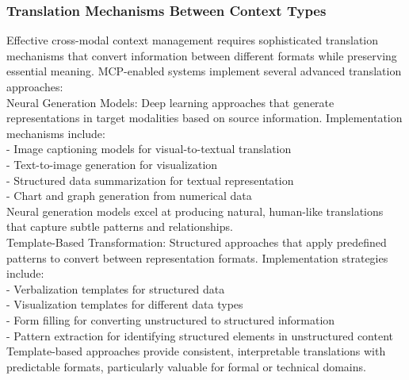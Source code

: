 \subsubsection{Translation Mechanisms Between Context Types}
Effective cross-modal context management requires sophisticated translation mechanisms that convert information between different formats while preserving essential meaning. MCP-enabled systems implement several advanced translation approaches:\\ \newline
Neural Generation Models: Deep learning approaches that generate representations in target modalities based on source information. Implementation mechanisms include:\\ \newline
- Image captioning models for visual-to-textual translation\\ \newline
- Text-to-image generation for visualization\\ \newline
- Structured data summarization for textual representation\\ \newline
- Chart and graph generation from numerical data\\ \newline
Neural generation models excel at producing natural, human-like translations that capture subtle patterns and relationships.\\ \newline
Template-Based Transformation: Structured approaches that apply predefined patterns to convert between representation formats. Implementation strategies include:\\ \newline
- Verbalization templates for structured data\\ \newline
- Visualization templates for different data types\\ \newline
- Form filling for converting unstructured to structured information\\ \newline
- Pattern extraction for identifying structured elements in unstructured content\\ \newline
Template-based approaches provide consistent, interpretable translations with predictable formats, particularly valuable for formal or technical domains.\\ \newline
